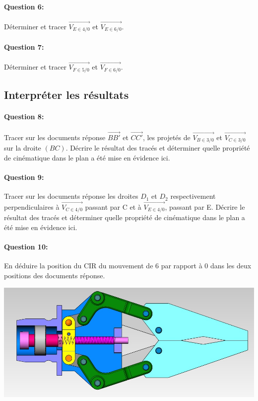\reponse[1]

\paragraph{Question 6:} Déterminer et tracer $\overrightarrow{V_{E\in 4/0}}$ et $\overrightarrow{V_{E\in 6/0}}$.

\reponse[1]

\paragraph{Question 7:} Déterminer et tracer $\overrightarrow{V_{F\in 5/0}}$ et $\overrightarrow{V_{F\in 6/0}}$.

\reponse[1]

\subsection{Interpréter les résultats}
	
\paragraph{Question 8:} Tracer sur les documents réponse $\overrightarrow{BB'}$ et $\overrightarrow{CC'}$, les projetés de $\overrightarrow{V_{B\in 3/0}}$ et $\overrightarrow{V_{C\in 3/0}}$ sur la droite $(BC)$. Décrire le résultat des tracés et déterminer quelle propriété de cinématique dans le plan a été mise en évidence ici.
	
\paragraph{Question 9:} Tracer sur les documents réponse les droites $D_1$ et $D_2$ respectivement perpendiculaires à $\overrightarrow{V_{C\in 4/0}}$ passant par C et à $\overrightarrow{V_{E\in 4/0}}$, passant par E. Décrire le résultat des tracés et déterminer quelle propriété de cinématique dans le plan a été mise en évidence ici.

\paragraph{Question 10:} En déduire la position du CIR du mouvement de 6 par rapport à 0 dans les deux positions des documents réponse.

\includegraphics[width=0.9\linewidth]{img/pince_fermee}

